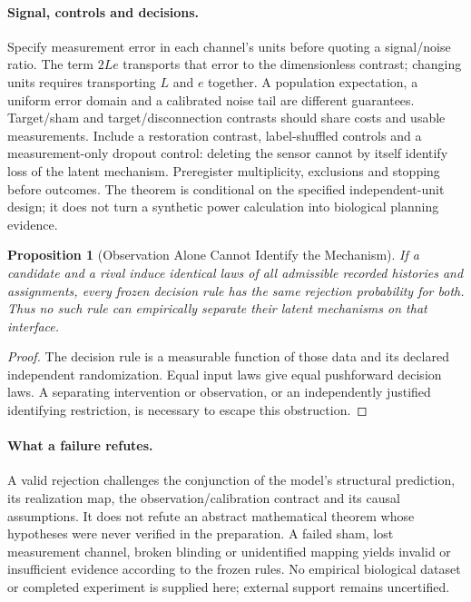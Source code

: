 \documentclass[11pt,a4paper]{article}
\newtheorem{proposition}[theorem]{Proposition}
\theoremstyle{definition}
\begin{document}
\paragraph{Signal, controls and decisions.}
Specify measurement error in each channel's units before quoting a signal/noise ratio. The term $2Le$ transports that error to the dimensionless contrast; changing units requires transporting $L$ and $e$ together. A population expectation, a uniform error domain and a calibrated noise tail are different guarantees. Target/sham and target/disconnection contrasts should share costs and usable measurements. Include a restoration contrast, label-shuffled controls and a measurement-only dropout control: deleting the sensor cannot by itself identify loss of the latent mechanism. Preregister multiplicity, exclusions and stopping before outcomes. The theorem is conditional on the specified independent-unit design; it does not turn a synthetic power calculation into biological planning evidence.

\begin{proposition}[Observation Alone Cannot Identify the Mechanism]\label{prop:external-interface-nonidentifiability}
If a candidate and a rival induce identical laws of all admissible recorded histories and assignments, every frozen decision rule has the same rejection probability for both. Thus no such rule can empirically separate their latent mechanisms on that interface.
\end{proposition}
\begin{proof}
The decision rule is a measurable function of those data and its declared independent randomization. Equal input laws give equal pushforward decision laws. A separating intervention or observation, or an independently justified identifying restriction, is necessary to escape this obstruction.
\end{proof}

\paragraph{What a failure refutes.}
A valid rejection challenges the conjunction of the model's structural prediction, its realization map, the observation/calibration contract and its causal assumptions. It does not refute an abstract mathematical theorem whose hypotheses were never verified in the preparation. A failed sham, lost measurement channel, broken blinding or unidentified mapping yields invalid or insufficient evidence according to the frozen rules. No empirical biological dataset or completed experiment is supplied here; external support remains uncertified.
\end{document}
